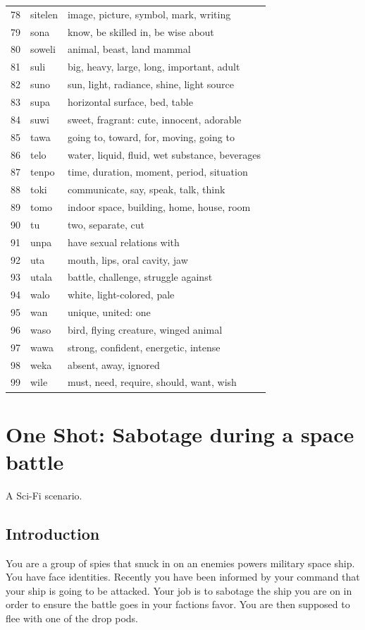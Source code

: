 \documentclass[11pt]{article}
\begin{document}
{\begin{multicols}{2}[]
\begin{center}
\begin{tabularx}{\linewidth}{rlX}
78 & sitelen & image, picture, symbol, mark, writing\\
79 & sona & know, be skilled in, be wise about\\
80 & soweli & animal, beast, land mammal\\
81 & suli & big, heavy, large, long, important, adult\\
82 & suno & sun, light, radiance, shine, light source\\
83 & supa & horizontal surface, bed, table\\
84 & suwi & sweet, fragrant: cute, innocent, adorable\\
85 & tawa & going to, toward, for, moving, going to\\
86 & telo & water, liquid, fluid, wet substance, beverages\\
87 & tenpo & time, duration, moment, period, situation\\
88 & toki & communicate, say, speak, talk, think\\
89 & tomo & indoor space, building, home, house, room\\
90 & tu & two, separate, cut\\
91 & unpa & have sexual relations with\\
92 & uta & mouth, lips, oral cavity, jaw\\
93 & utala & battle, challenge, struggle against\\
94 & walo & white, light-colored, pale\\
95 & wan & unique, united: one\\
96 & waso & bird, flying creature, winged animal\\
97 & wawa & strong, confident, energetic, intense\\
98 & weka & absent, away, ignored\\
99 & wile & must, need, require, should, want, wish\\
\end{tabularx}
\end{center}
\end{multicols}
\normalsize
\section{One Shot: Sabotage during a space battle}
\label{sec:org8cce6a8}

A Sci-Fi scenario.
\subsection{Introduction}
\label{sec:orgc7dd1e9}
You are a group of spies that snuck in on an enemies powers military space ship. You have face identities. Recently you have been informed by your command that your ship is going to be attacked. Your job is to sabotage the ship you are on in order to ensure the battle goes in your factions favor. You are then supposed to flee with one of the drop pods.
}
\end{document}
